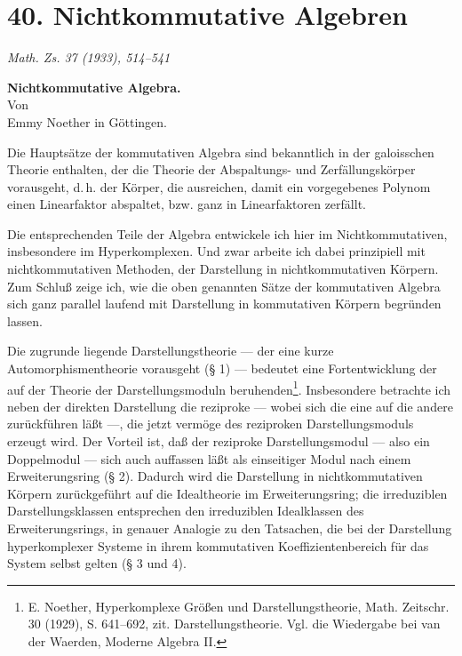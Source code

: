 \section*{40. Nichtkommutative Algebren}

\begin{center}
\emph{Math. Zs. 37 (1933), 514--541}
\end{center}

\begin{center}
\textbf{Nichtkommutative Algebra.}\\[0.5em]
Von\\[0.25em]
Emmy Noether in Göttingen.
\end{center}

Die Hauptsätze der kommutativen Algebra sind bekanntlich in der galoisschen Theorie enthalten, der die Theorie der Abspaltungs- und Zerfällungskörper vorausgeht, d.\,h. der Körper, die ausreichen, damit ein vorgegebenes Polynom einen Linearfaktor abspaltet, bzw. ganz in Linearfaktoren zerfällt.

Die entsprechenden Teile der Algebra entwickele ich hier im Nichtkommutativen, insbesondere im Hyperkomplexen. Und zwar arbeite ich dabei prinzipiell mit nichtkommutativen Methoden, der Darstellung in nichtkommutativen Körpern. Zum Schluß zeige ich, wie die oben genannten Sätze der kommutativen Algebra sich ganz parallel laufend mit Darstellung in kommutativen Körpern begründen lassen.

Die zugrunde liegende Darstellungstheorie --- der eine kurze Automorphismen\-theorie vorausgeht (§ 1) --- bedeutet eine Fortentwicklung der auf der Theorie der Darstellungsmoduln beruhenden\footnote{E. Noether, Hyperkomplexe Größen und Darstellungstheorie, Math. Zeitschr. 30 (1929), S. 641--692, zit. Darstellungstheorie. Vgl. die Wiedergabe bei van der Waerden, Moderne Algebra II.}. Insbesondere betrachte ich neben der direkten Darstellung die reziproke --- wobei sich die eine auf die andere zurückführen läßt ---, die jetzt vermöge des reziproken Darstellungsmoduls erzeugt wird. Der Vorteil ist, daß der reziproke Darstellungsmodul --- also ein Doppelmodul --- sich auch auffassen läßt als einseitiger Modul nach einem Erweiterungsring (§ 2). Dadurch wird die Darstellung in nichtkommutativen Körpern zurückgeführt auf die Idealtheorie im Erweiterungsring; die irreduziblen Darstellungsklassen entsprechen den irreduziblen Idealklassen des Erweiterungsrings, in genauer Analogie zu den Tatsachen, die bei der Darstellung hyperkomplexer Systeme in ihrem kommutativen Koeffizientenbereich für das System selbst gelten (§ 3 und 4).

